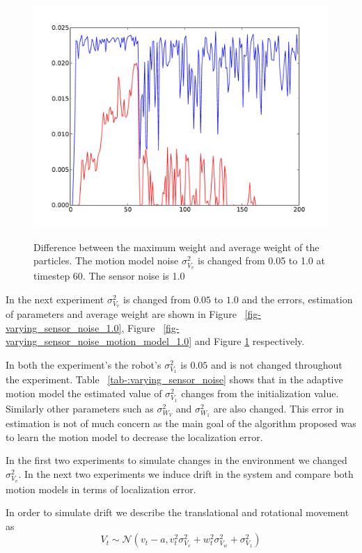 \documentclass[12pt]{dalcsthesis}
\begin{document}
\begin{figure}[!ht]
  \centering
     {\includegraphics[height = 3.0 in]{./plots/200_005_10_s_10_max_weight.pdf}}
  \caption{\label{fig-varying_sensor_noise_sensor_model_1.0_max_weight} Difference between the maximum weight and average weight of the particles. The motion model noise $\sigma_{V_{v}}^{2}$ is changed from 0.05 to 1.0 at timestep 60. The sensor noise is 1.0}
\end{figure}

In the next experiment $\sigma_{V_{v}}^2$ is changed from $0.05$ to $1.0$ and the errors, estimation of parameters and average weight are shown in Figure ~\ref{fig-varying_sensor_noise_1.0}, Figure ~\ref{fig-varying_sensor_noise_motion_model_1.0} and Figure \ref{fig-varying_sensor_noise_sensor_model_1.0_max_weight} respectively. 

In both the experiment's the robot's $\sigma_{V_{1}}^2$ is $0.05$ and is not changed throughout the experiment. Table ~\ref{tab-:varying_sensor_noise} shows that in the adaptive motion model the estimated value of $\sigma_{V_{1}}^2$ changes from the initialization value. Similarly other parameters such as $\sigma_{W_{V}}^2$ and $\sigma_{W_{1}}^2$ are also changed. This error in estimation is not of much concern as the main goal of the algorithm proposed was to learn the motion model to decrease the localization error. 
  
In the first two experiments to simulate changes in the environment we changed $\sigma_{V_{v}}^2$. In the next two experiments we induce drift in the system and compare both motion models in terms of localization error.

In order to simulate drift we describe the translational and rotational movement as
\begin{equation}
\label{eq- drift subtract}
V_{t}\sim\mathcal{{N}}(v_{t}-a,v_{t}^{2}\sigma_{V_{v}}^{2}+w_{t}^{2}\sigma_{V_{w}}^{2}+\sigma_{V_{1}}^{2})
\end{equation}
\end{document}
